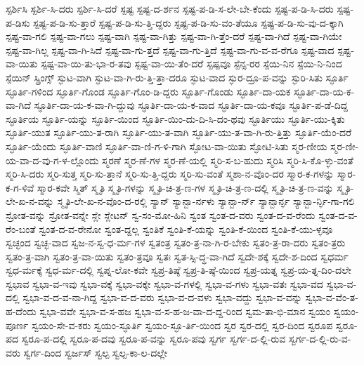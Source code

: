 {ಸ್ಪರ್ಶಿಸಿ
ಸ್ಪರ್ಶಿ-ಸಿ-ದರು
ಸ್ಪರ್ಶಿ-ಸಿ-ದರೆ
ಸ್ಪಷ್ಟ
ಸ್ಪಷ್ಟ-ದ-ರ್ಶನ
ಸ್ಪಷ್ಟ-ಪ-ಡಿ-ಸ-ಲೇ-ಬೇ-ಕೆಂದು
ಸ್ಪಷ್ಟ-ಪ-ಡಿ-ಸಿ-ದರು
ಸ್ಪಷ್ಟ-ಪ-ಡಿಸು
ಸ್ಪಷ್ಟ-ಪ-ಡಿ-ಸು-ತ್ತಾರೆ
ಸ್ಪಷ್ಟ-ಪ-ಡಿ-ಸು-ತ್ತಿ-ದ್ದರು
ಸ್ಪಷ್ಟ-ಪ-ಡಿ-ಸು-ವಂ-ತೆಯೂ
ಸ್ಪಷ್ಟ-ಪ-ಡಿ-ಸು-ವು-ದ-ಕ್ಕಾಗಿ
ಸ್ಪಷ್ಟ-ವಾ-ಗಲಿ
ಸ್ಪಷ್ಟ-ವಾ-ಗಲು
ಸ್ಪಷ್ಟ-ವಾಗಿ
ಸ್ಪಷ್ಟ-ವಾ-ಗಿತ್ತು
ಸ್ಪಷ್ಟ-ವಾ-ಗಿ-ತ್ತೆಂ-ದರೆ
ಸ್ಪಷ್ಟ-ವಾ-ಗಿದೆ
ಸ್ಪಷ್ಟ-ವಾ-ಗಿಯೇ
ಸ್ಪಷ್ಟ-ವಾ-ಗಿಲ್ಲ
ಸ್ಪಷ್ಟ-ವಾ-ಗಿ-ಸಿದೆ
ಸ್ಪಷ್ಟ-ವಾ-ಗು-ತ್ತದೆ
ಸ್ಪಷ್ಟ-ವಾ-ಗು-ತ್ತಿದೆ
ಸ್ಪಷ್ಟ-ವಾ-ಗು-ವ-ವ-ರೆಗೂ
ಸ್ಪಷ್ಟ-ವಾದ
ಸ್ಪಷ್ಟ-ವಾ-ಯಿತು
ಸ್ಪಷ್ಟ-ವಾ-ಯಿ-ತು-ಭಾ-ರ-ತವು
ಸ್ಪಷ್ಟ-ವಾ-ಯಿ-ತೆಂ-ದರೆ
ಸ್ಪಷ್ಪವೂ
ಸ್ಪೆನ್ಸ-ರರ
ಸ್ಪೆಯಿ-ನಿನ
ಸ್ಪೆಯಿ-ನಿ-ನಿಂದ
ಸ್ಪೆಯಿನ್
ಸ್ಪ್ರಿಂಗ್ಸ್
ಸ್ಫುಟ-ವಾಗಿ
ಸ್ಫುಟ-ವಾ-ಗಿ-ರು-ತ್ತಿ-ತ್ತಾ-ದರೂ
ಸ್ಫುಟ-ವಾದ
ಸ್ಫುರ-ದ್ರೂ-ಪ-ವನ್ನು
ಸ್ಫುರಿ-ಸಿತು
ಸ್ಫೂರ್ತಿ
ಸ್ಫೂರ್ತಿ-ಗಳಿಂದ
ಸ್ಫೂರ್ತಿ-ಗೊಂಡ
ಸ್ಫೂರ್ತಿ-ಗೊಂ-ಡಿ-ದ್ದರು
ಸ್ಫೂರ್ತಿ-ಗೊಂಡು
ಸ್ಫೂರ್ತಿ-ದಾ-ಯಕ
ಸ್ಫೂರ್ತಿ-ದಾ-ಯ-ಕ-ವಾ-ಗಿದೆ
ಸ್ಫೂರ್ತಿ-ದಾ-ಯ-ಕ-ವಾ-ಗಿ-ದ್ದುವು
ಸ್ಫೂರ್ತಿ-ದಾ-ಯ-ಕ-ವಾದ
ಸ್ಫೂರ್ತಿ-ದಾ-ಯ-ಕವೂ
ಸ್ಫೂರ್ತಿ-ಪ-ಡೆ-ದಿದ್ದ
ಸ್ಫೂರ್ತಿಯ
ಸ್ಫೂರ್ತಿ-ಯನ್ನು
ಸ್ಫೂರ್ತಿ-ಯಿಂದ
ಸ್ಫೂರ್ತಿ-ಯಿಂ-ದು-ದಿ-ಸಿ-ದಂ-ಥವು
ಸ್ಫೂರ್ತಿಯು
ಸ್ಫೂರ್ತಿ-ಯು-ಕ್ಕಿತು
ಸ್ಫೂರ್ತಿ-ಯುತ
ಸ್ಫೂರ್ತಿ-ಯು-ತ-ರಾಗಿ
ಸ್ಫೂರ್ತಿ-ಯು-ತ-ವಾಗಿ
ಸ್ಫೂರ್ತಿ-ಯು-ತ-ವಾ-ಗಿ-ರು-ತ್ತಿತ್ತು
ಸ್ಫೂರ್ತಿ-ಯೆಂ-ದರೆ
ಸ್ಫೂರ್ತಿ-ಯೆಂದು
ಸ್ಫೂರ್ತಿ-ವಾಣಿ
ಸ್ಫೂರ್ತಿ-ವಾ-ಣಿ-ಗ-ಳಿ-ಗಾಗಿ
ಸ್ಫೋಟ-ವಾ-ಯಿತು
ಸ್ಫೋಟಿ-ಸಿತು
ಸ್ಮರ-ಣೀಯ
ಸ್ಮರ-ಣೀ-ಯ-ವಾ-ದ-ವು-ಗ-ಳ-ಲ್ಲೊಂದು
ಸ್ಮರಣೆ
ಸ್ಮರ-ಣೆ-ಗಳ
ಸ್ಮರ-ಣೆ-ಯಲ್ಲಿ
ಸ್ಮರಿ-ಸ-ಬ-ಹುದು
ಸ್ಮರಿಸಿ
ಸ್ಮರಿ-ಸಿ-ಕೊ-ಳ್ಳು-ವಂತೆ
ಸ್ಮರಿ-ಸಿ-ದರು
ಸ್ಮರಿ-ಸುತ್ತ
ಸ್ಮರಿ-ಸು-ತ್ತಾನೆ
ಸ್ಮರಿ-ಸು-ತ್ತಿ-ದ್ದರು
ಸ್ಮರಿ-ಸು-ವಂತೆ
ಸ್ಮಶಾ-ನ-ವೊಂ-ದರ
ಸ್ಮಾರ-ಕ-ಗಳನ್ನು
ಸ್ಮಾರ-ಕ-ಗ-ಳಿವೆ
ಸ್ಮಾರ-ಕವೇ
ಸ್ಮಿತ್
ಸ್ಮೃತಿ
ಸ್ಮೃತಿ-ಗಳನ್ನು
ಸ್ಮೃತಿ-ಚಿ-ತ್ರ-ಣ-ಗಳ
ಸ್ಮೃತಿ-ಚಿ-ತ್ರ-ಣ-ದಲ್ಲಿ
ಸ್ಮೃತಿ-ಚಿ-ತ್ರ-ಣ-ವನ್ನು
ಸ್ಮೃತಿ-ಲೇ-ಖ-ನ-ವನ್ನು
ಸ್ಮೃತಿ-ಲೇ-ಖ-ನ-ವೊಂ-ದ-ರಲ್ಲಿ
ಸ್ಯಾನ್
ಸ್ಯಾನ್ಬಾ-ರ್ನಳು
ಸ್ಯಾನ್ಬಾ-ರ್ನ್
ಸ್ಯಾನ್ಬಾರ್ನ್ಳ
ಸ್ಯಾನ್ಬಾ-ರ್ನ್ಳಿ-ಗಾ-ಗಲಿ
ಸ್ರೋತ-ವನ್ನು
ಸ್ರೋತ-ವನ್ನೇ
ಸ್ಲೇ
ಸ್ಲೇಟನ್
ಸ್ವ-ಸಂ-ಮೋ-ಹಿನಿ
ಸ್ವಂತ
ಸ್ವಂತ-ದ-ವರು
ಸ್ವಂತ-ದ-ವ-ರೆಂದು
ಸ್ವಂತ-ದ-ವ-ರೆಂ-ಬಂತೆ
ಸ್ವಂತ-ದ-ವ-ರೇನೋ
ಸ್ವಂತ-ದ್ದಲ್ಲ
ಸ್ವಂತಿಕೆ
ಸ್ವಂತಿ-ಕೆ-ಯನ್ನು
ಸ್ವಂತಿ-ಕೆ-ಯಿಂದ
ಸ್ವಂತಿ-ಕೆ-ಯು-ಳ್ಳವೂ
ಸ್ವಚ್ಛಂದ
ಸ್ವಚ್ಛ-ವಾದ
ಸ್ವಜ-ನ-ಸ್ವ-ಧ-ರ್ಮ-ಗಳ
ಸ್ವತಂತ್ರ
ಸ್ವತಂ-ತ್ರ-ನಾ-ಗಿ-ರ-ಬೇಕು
ಸ್ವತಂ-ತ್ರ-ರಾ-ದರು
ಸ್ವತಂ-ತ್ರರು
ಸ್ವತಂ-ತ್ರ-ವಾಗಿ
ಸ್ವತಂ-ತ್ರ-ವಾ-ಯಿತು
ಸ್ವತಂ-ತ್ರವೂ
ಸ್ವತಃ
ಸ್ವತ-ಸ್ಸಿ-ದ್ಧ-ವಾ-ಗಿದೆ
ಸ್ವದೇ-ಶಕ್ಕೆ
ಸ್ವದೇ-ಶ-ದಿಂದ
ಸ್ವಧರ್ಮ
ಸ್ವಧ-ರ್ಮಕ್ಕೆ
ಸ್ವಧ-ರ್ಮ-ದಲ್ಲಿ
ಸ್ವಪ್ನ-ಲೋ-ಕವೇ
ಸ್ವಪ್ರ-ತಿಷ್ಠೆ
ಸ್ವಪ್ರ-ತಿ-ಷ್ಠೆ-ಯಿಂದ
ಸ್ವಪ್ರ-ಯತ್ನ
ಸ್ವಪ್ರ-ಯ-ತ್ನ-ದಿಂ-ದಲೇ
ಸ್ವಭಾವ
ಸ್ವಭಾ-ವ-ಇವು
ಸ್ವಭಾ-ವಕ್ಕೆ
ಸ್ವಭಾ-ವಕ್ಕೇ
ಸ್ವಭಾ-ವ-ಗಳಲ್ಲಿ
ಸ್ವಭಾ-ವ-ಗಳು
ಸ್ವಭಾ-ವತಃ
ಸ್ವಭಾ-ವದ
ಸ್ವಭಾ-ವ-ದಲ್ಲಿ
ಸ್ವಭಾ-ವ-ದ-ವ-ನಾ-ಗಿದ್ದ
ಸ್ವಭಾ-ವ-ದ-ವರು
ಸ್ವಭಾ-ವ-ದ-ವಳು
ಸ್ವಭಾ-ವದ್ದು
ಸ್ವಭಾ-ವ-ವನ್ನು
ಸ್ವಭಾ-ವ-ವೆಂ-ತ-ಹ-ದೆಂದು
ಸ್ವಭಾ-ವವೇ
ಸ್ವಭಾ-ವ-ಸ-ಹಜ
ಸ್ವಭಾ-ವ-ಸ-ಹ-ಜ-ವಾ-ದ-ದ್ದ-ರಿಂದ
ಸ್ವಮ-ತಾ-ಭಿ-ಮಾನ
ಸ್ವಯಂ
ಸ್ವಯಂ-ಪೂರ್ಣ
ಸ್ವಯಂ-ಸೇ-ವ-ಕರು
ಸ್ವಯಂ-ಸ್ಫೂರ್ತಿ
ಸ್ವಯಂ-ಸ್ಫೂ-ರ್ತಿ-ಯಿಂದ
ಸ್ವರ
ಸ್ವರ-ದಲ್ಲಿ
ಸ್ವರ-ದಿಂದ
ಸ್ವರೂಪ
ಸ್ವರೂ-ಪದ
ಸ್ವರೂ-ಪ-ದಲ್ಲಿ
ಸ್ವರೂ-ಪ-ದವು
ಸ್ವರೂ-ಪ-ವನ್ನು
ಸ್ವರೂ-ಪವು
ಸ್ವರ್ಗ
ಸ್ವರ್ಗ-ದ-ಲ್ಲಿ-ರುವ
ಸ್ವರ್ಗ-ದ-ಲ್ಲಿ-ರು-ವ-ವರು
ಸ್ವರ್ಗ-ದಿಂದ
ಸ್ವರ್ಜಸ್
ಸ್ವಲ್ಪ
ಸ್ವಲ್ಪ-ಕಾ-ಲ-ದಲ್ಲೇ
}
